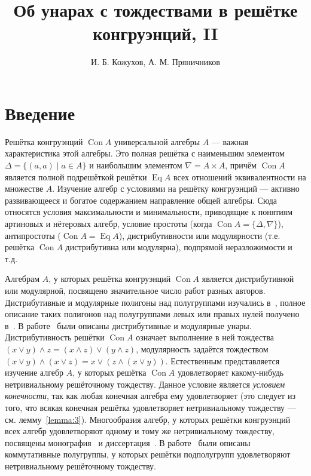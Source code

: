 \documentclass[11pt,twoside,final
]{article}
\title
{%
Об унарах с тождествами в решётке конгруэнций, II}
{%
On unars with identities in congruence lattice, II}
\author
{%
И. Б. Кожухов, А. М. Пряничников}
{%
I. B. Kozhukhov, A. M. Pryanichnikov}
\def\Con{\operatorname{Con}}
\def\Eq{\operatorname{Eq}}
\begin{document}
\maketitle

\enmaketitle

\section{Введение}

Решётка конгруэнций $\Con A$ универсальной алгебры $A$ — важная характеристика этой алгебры.
Это полная решётка с наименьшим элементом $\Delta = \{ (a,a) \mid a \in A \}$ и наибольшим элементом $\nabla = A \times A$, причём $\Con A$ является полной подрешёткой решётки $\Eq A$ всех отношений эквивалентности на множестве $A$.
Изучение алгебр с условиями на решётку конгруэнций — активно развивающееся и богатое содержанием направление общей алгебры.
Сюда относятся условия максимальности и минимальности, приводящие к понятиям артиновых и нётеровых алгебр, условие простоты (когда $\Con A = \{ \Delta, \nabla \}$), антипростоты ($\Con A = \Eq A$), дистрибутивности или модулярности (т.е. решётка $\Con A$ дистрибутивна или модулярна), подпрямой неразложимости и т.д.

Алгебрам $A$, у которых решётка конгруэнций $\Con A$ является дистрибутивной или модулярной, посвящено значительное число работ разных авторов.
Дистрибутивные и модулярные полигоны над полугруппами изучались в~\cite{Ptakhov_2}, полное описание таких полигонов над полугруппами левых или правых нулей получено в~\cite{Khaliullina_3}.
В работе~\cite{Egorova_4} были описаны дистрибутивные и модулярные унары.
Дистрибутивность решётки $\Con A$ означает выполнение в ней тождества $ (x \vee y) \wedge z = (x \wedge z) \vee (y \wedge z) $, модулярность задаётся тождеством $ (x \vee y) \wedge (x \vee z) = x \vee (z \wedge (x \vee y)) $.
Естественным представляется изучение алгебр $A$, у которых решётка $\Con A$ удовлетворяет какому-нибудь нетривиальному решёточному тождеству.
Данное условие является \textit{условием конечности}, так как любая конечная алгебра ему удовлетворяет (это следует из того, что всякая конечная решётка удовлетворяет нетривиальному тождеству — см. лемму~\ref{lemma:3}).
Многообразия алгебр, у которых решётки конгруэнций всех алгебр удовлетворяют одному и тому же нетривиальному тождеству, посвящены монография~\cite{Kearnes_5} и диссертация~\cite{Nation_6}.
В работе~\cite{Repnitsky_7} были описаны коммутативные полугруппы, у которых решётки подполугрупп удовлетворяют нетривиальному решёточному тождеству.
\end{document}
